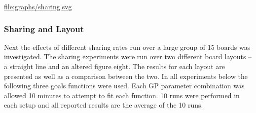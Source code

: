 \documentclass[11pt]{article}
\begin{document}
\href{file:///nfs/adaptive/eschulte/src/gp4ixm-report/graphs/sharing.svg}{file:graphs/sharing.svg}

\subsubsection*{Sharing and Layout}
\label{sec-1.5.3}

Next the effects of different sharing rates run over a large group of
15 boards was investigated.  The sharing experiments were run over two
different board layouts -- a straight line and an altered figure
eight.  The results for each layout are presented as well as a
comparison between the two.  In all experiments below the following
three goals functions were used.  Each GP parameter combination was
allowed 10 minutes to attempt to fit each function.  10 runs were
performed in each setup and all reported results are the average of
the 10 runs.
\end{document}
